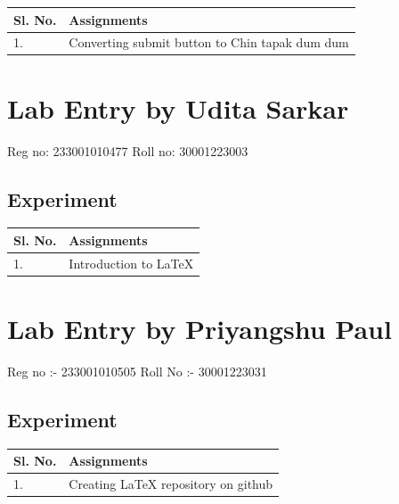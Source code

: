 \documentclass[12pt, a4paper]{article}
\begin{document}
\vspace{0.5cm}
\begin{table}[ht]
\centering
\begin{tabular}{|p{50pt}|p{200pt}|}
\hline
\textbf{Sl. No.} & \textbf{Assignments} \\ \hline
1. & Converting submit button to Chin tapak dum dum \\ \hline
\end{tabular}
\end{table}

\newpage

\usetikzlibrary{calc}

\section{Lab Entry by Udita Sarkar}
Reg no: 233001010477
Roll no: 30001223003
\subsection{Experiment}

\vspace{0.5cm}
\begin{table}[ht]
\centering
\begin{tabular}{|p{50pt}|p{200pt}|}
\hline
\textbf{Sl. No.} & \textbf{Assignments} \\ \hline
1. & Introduction to LaTeX \\ \hline
\end{tabular}
\end{table}

\vspace{2.5cm}
\section{Lab Entry by Priyangshu Paul}
Reg no :- 233001010505
Roll No :- 30001223031
\subsection{Experiment}

\vspace{0.5cm}
\begin{table}[ht]
\centering
\begin{tabular}{|p{50pt}|p{200pt}|}
\hline
\textbf{Sl. No.} & \textbf{Assignments} \\ \hline
1. & Creating LaTeX repository on github \\ \hline
\end{tabular}
\end{table}
\end{document}
